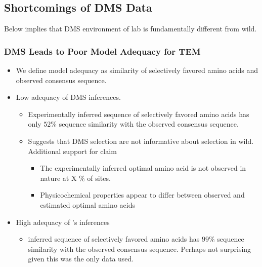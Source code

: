 \documentclass[12pt]{article}
\begin{document}
\subsection*{Shortcomings of DMS Data}
Below implies that DMS environment of lab is fundamentally different from wild.
\subsubsection*{DMS Leads to Poor Model Adequacy for TEM}
\begin{itemize}
	\item We define model adequacy as similarity of selectively favored amino acids and observed consensus sequence.
	\item Low adequacy of DMS inferences.
	\begin{itemize}
		\item Experimentally inferred sequence of selectively favored amino acids has only $52 \%$ sequence similarity with the observed consensus sequence.
		\item Suggests that DMS selection are not informative about selection in wild.
		Additional support for claim
		\begin{itemize}
			\item The experimentally inferred optimal amino acid is not observed in nature at X \% of sites.
			\item Physicochemical properties appear to differ between observed and estimated optimal amino acids
		\end{itemize}
	\end{itemize}
	\item High adequacy of \selac's inferences
	\begin{itemize}
		\item \selac inferred sequence of selectively favored amino acids has $99 \%$ sequence similarity with the observed consensus sequence.
		Perhaps not surprising given this was the only data \selac used.
	\end{itemize}	
\end{itemize}
\end{document}

